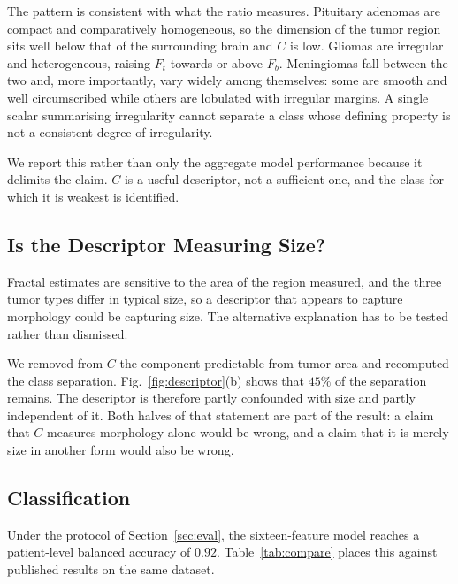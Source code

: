 \documentclass[journal]{IEEEtran}
\begin{document}
The pattern is consistent with what the ratio measures. Pituitary adenomas are
compact and comparatively homogeneous, so the dimension of the tumor region sits
well below that of the surrounding brain and $C$ is low. Gliomas are irregular
and heterogeneous, raising $F_t$ towards or above $F_b$. Meningiomas fall between
the two and, more importantly, vary widely among themselves: some are smooth and
well circumscribed while others are lobulated with irregular margins. A single
scalar summarising irregularity cannot separate a class whose defining property
is not a consistent degree of irregularity.

We report this rather than only the aggregate model performance because it
delimits the claim. $C$ is a useful descriptor, not a sufficient one, and the
class for which it is weakest is identified.

\subsection{Is the Descriptor Measuring Size?}
\label{sec:size}
Fractal estimates are sensitive to the area of the region measured, and the three
tumor types differ in typical size, so a descriptor that appears to capture
morphology could be capturing size. The alternative explanation has to be tested
rather than dismissed.

We removed from $C$ the component predictable from tumor area and recomputed the
class separation. Fig.~\ref{fig:descriptor}(b) shows that $45\%$ of the
separation remains. The descriptor is therefore partly confounded with size and
partly independent of it. Both halves of that statement are part of the result:
a claim that $C$ measures morphology alone would be wrong, and a claim that it is
merely size in another form would also be wrong.

\subsection{Classification}
Under the protocol of Section~\ref{sec:eval}, the sixteen-feature model reaches a
patient-level balanced accuracy of $0.92$. Table~\ref{tab:compare} places this
against published results on the same dataset.
\end{document}
